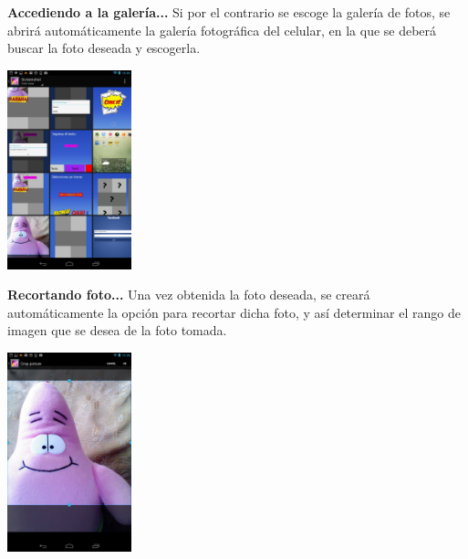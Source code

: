 \documentclass[12pt]{report}
\begin{document}
\begingroup
		\large{
			\textbf{
				Accediendo a la galería...
				\newline
				\newline
			}
		}
	\endgroup
Si por el contrario se escoge la galería de fotos, se abrirá automáticamente la galería fotográfica del celular, en la que se deberá buscar la foto deseada y escogerla.
\newline
\newline
	\begin{center}
		\begingroup
			\includegraphics[width=0.27\textwidth]{imagenes_usuario/galeria.png}
		\endgroup
	\end{center}


\begingroup
		\large{
			\textbf{
				Recortando foto...
				\newline
				\newline
			}
		}
	\endgroup
Una vez obtenida la foto deseada, se creará automáticamente la opción para recortar dicha foto, y así determinar el rango de imagen que se desea de la foto tomada.
\newline
	\begin{center}
		\begingroup
			\includegraphics[width=0.27\textwidth]{imagenes_usuario/crop.png}
		\endgroup
	\end{center}
\end{document}
